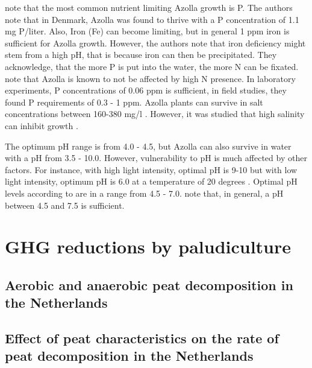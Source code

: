 {\citet{lumpkin1980azolla} note that the most common nutrient limiting Azolla growth is P. The authors note that in Denmark, Azolla was found to thrive with a P concentration of 1.1 mg P/liter. Also, Iron (Fe) can become limiting, but in general 1 ppm iron is  sufficient for Azolla growth. However, the authors note that iron deficiency might stem from a high pH, that is because iron can then be precipitated. They acknowledge, that the more P is put into the water, the more N can be fixated. \citet{sabetraftar2013review} note that Azolla is known to not be affected by high N presence. In laboratory experiments, P concentrations of 0.06 ppm is sufficient, in field studies, they found P requirements of 0.3 - 1 ppm. Azolla plants can survive in salt concentrations between 160-380 mg/l  \citep{lumpkin1980azolla}. However, it was studied that high salinity can inhibit growth \citep{sabetraftar2013review, lumpkin1980azolla}. 

The optimum pH range is from 4.0 - 4.5, but Azolla can also survive in water with a pH from 3.5 - 10.0. However, vulnerability to pH is much affected by other factors. For instance, with high light intensity, optimal pH is 9-10 but with low light intensity, optimum pH is 6.0 at a temperature of 20 degrees \citep{wagner1997azolla}. Optimal pH levels according to \citet{lumpkin1980azolla} are in a range from 4.5 - 7.0. \citet{sabetraftar2013review} note that, in general, a pH between 4.5 and 7.5 is sufficient.


\chapter{GHG reductions by paludiculture}

\section{Aerobic and anaerobic peat decomposition in the Netherlands}

\section{Effect of peat characteristics on the rate of peat decomposition in the Netherlands}

}
